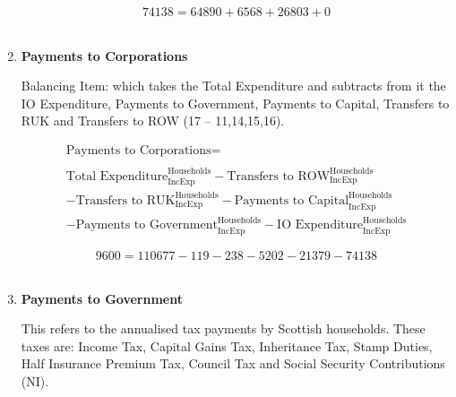 \begin{enumerate}
\begin{equation} \nonumber
74138 = 64890+6568+26803+0
\end{equation}\\


\item \textbf {Payments to Corporations}

Balancing Item: which takes the Total Expenditure and subtracts from it the IO Expenditure, Payments to Government, Payments to Capital, Transfers to RUK and Transfers to ROW (17 – 11,14,15,16).

\begin{equation}
\begin{split}
\text{Payments to Corporations} =  \\ \\
\text{Total Expenditure}^\text{Households}_\text{IncExp}-\text{Transfers to ROW}^\text{Households}_\text{IncExp}\\
-\text{Transfers to RUK}^\text{Households}_\text{IncExp}-\text{Payments to Capital}^\text{Households}_\text{IncExp}\\
-\text{Payments to Government}^\text{Households}_\text{IncExp}-\text{IO Expenditure}^\text{Households}_\text{IncExp}
\end{split} \label{eq:2.5.16}
\end{equation}

\begin{equation} \nonumber
9600 = 110677-119-238-5202-21379-74138
\end{equation}\\


\item \textbf {Payments to Government}

This refers to the annualised tax payments by Scottish households. These taxes are: Income Tax, Capital Gains Tax, Inheritance Tax, Stamp Duties, Half Insurance Premium Tax, Council Tax and Social Security Contributions (NI). \cite{ScotGov2013b}


\end{enumerate}
